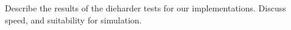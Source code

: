 Describe the results of the dieharder tests for our implementations. Discuss speed, and suitability for simulation.
